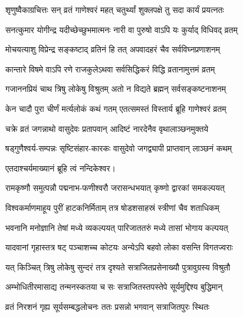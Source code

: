 

\twolineshloka
{शृणुष्वैकाग्रचित्तः सन् व्रतं गाणेश्वरं महत्}
{चतुर्थ्यां शुक्लपक्षे तु सदा कार्यं प्रयत्नतः}%

\twolineshloka
{सनत्कुमार योगीन्द्र यदीच्छेच्छुभमात्मनः}
{नारी वा पुरुषो वाऽपि यः कुर्याद् विधिवद् व्रतम्}%

\twolineshloka
{मोचयत्याशु विप्रेन्द्र सङ्कष्टाद् व्रतिनं हि तत्}
{अपवादहरं चैव सर्वविघ्नप्रणाशनम्}%

\twolineshloka
{कान्तारे विषमे वाऽपि रणे राजकुलेऽथवा}
{सर्वसिद्धिकरं विद्धि व्रतानामुत्तमं व्रतम्}%

\twolineshloka
{गजाननप्रियं चाथ त्रिषु लोकेषु विश्रुतम्}
{अतो न विद्यते ब्रह्मन् सर्वसङ्कष्टनाशनम्}%


\twolineshloka
{केन चादौ पुरा चीर्णं मर्त्यलोकं कथं गतम्}
{एतत्समस्तं विस्तार्य ब्रूहि गाणेश्वरं व्रतम्}%

\twolineshloka
{चक्रे व्रतं जगन्नाथो वासुदेवः प्रतापवान्}
{आदिष्टं नारदेनैव वृथालाञ्छनमुक्तये}%

\twolineshloka
{षड्गुणैश्वर्य-सम्पन्नः सृष्टिसंहार-कारकः} 
{वासुदेवो जगद्व्यापी प्राप्तवान् लाञ्छनं कथम्}%

एतदाश्चर्यमाख्यानं ब्रूहि त्वं नन्दिकेश्वर।


\twolineshloka
{रामकृष्णौ समुत्पन्नौ पद्मनाभ-फणीश्वरौ}
{जरासन्धभयात् कृष्णो द्वारकां समकल्पयत्}%

\twolineshloka
{विश्वकर्माणमाहूय पुरीं हाटकनिर्मिताम्}
{तत्र षोडशसाहस्रं स्त्रीणां चैव शताधिकम्}%

\twolineshloka
{भवनानि मनोज्ञानि तेषां मध्ये व्यकल्पयत्}
{पारिजाततरुं मध्ये तासां भोगाय कल्पयत्}%

\twolineshloka
{यादवानां गृहास्तत्र षट् पञ्चाशच्च कोटयः}
{अन्येऽपि बहवो लोका वसन्ति विगतज्वराः}%

\twolineshloka
{यत् किञ्चित् त्रिषु लोकेषु सुन्दरं तत्र दृश्यते}
{सत्राजितप्रसेनाख्यौ पुत्रावुग्रस्य विश्रुतौ}%

\twolineshloka
{अम्भोधितीरमासाद्य तन्मनस्कतया च सः}
{सत्राजितस्तपस्तेपे सूर्यमुद्दिश्य बुद्धिमान्}%

\twolineshloka
{व्रतं निरशनं गृह्य सूर्यसम्बद्धलोचनः}
{ततः प्रसन्नो भगवान् सत्राजितपुरः स्थितः}%


